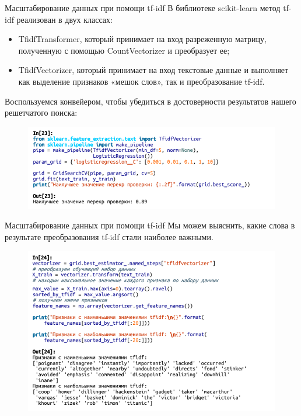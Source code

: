 \documentclass{beamer}
\begin{document}
\begin{frame}{Масштабирование данных при помощи tf-idf}
В библиотеке scikit-learn метод tf-idf реализован в двух классах: 
\begin{itemize}
\item TfidfTransformer, который принимает на вход разреженную матрицу, полученную с помощью CountVectorizer и преобразует ее; 
\item TfidfVectorizer, который принимает на вход текстовые данные и выполняет как выделение признаков «мешок слов», так и преобразование tf-idf. 
\end{itemize}
Воспользуемся конвейером, чтобы убедиться в достоверности результатов нашего решетчатого поиска:
\begin{figure}[h]
\centering
\includegraphics[scale=0.5]{images/lec09-pic23.png}
\end{figure}
\end{frame}

\begin{frame}{Масштабирование данных при помощи tf-idf}
Мы можем выяснить, какие слова в результате преобразования tf-idf стали наиболее важными.
\begin{figure}[h]
\centering
\includegraphics[scale=0.75]{images/lec09-pic24.png}
\end{figure}
\end{frame}
\end{document}

